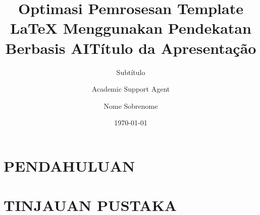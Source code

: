 \documentclass{beamer}
\title{Optimasi Pemrosesan Template LaTeX Menggunakan Pendekatan Berbasis AI}
\author{Academic Support Agent}
\date{\today}
\begin{document}
\maketitle

\begin{abstract}

\end{abstract}

\chapter{PENDAHULUAN}


\chapter{TINJAUAN PUSTAKA}


\usepackage[brazil]{babel}
\usepackage{source/littoral}
\usepackage[none]{hyphenat}

\title{\textbf{Título da Apresentação}}
\subtitle{Subtítulo}
\author{Nome Sobrenome}

\end{document}
